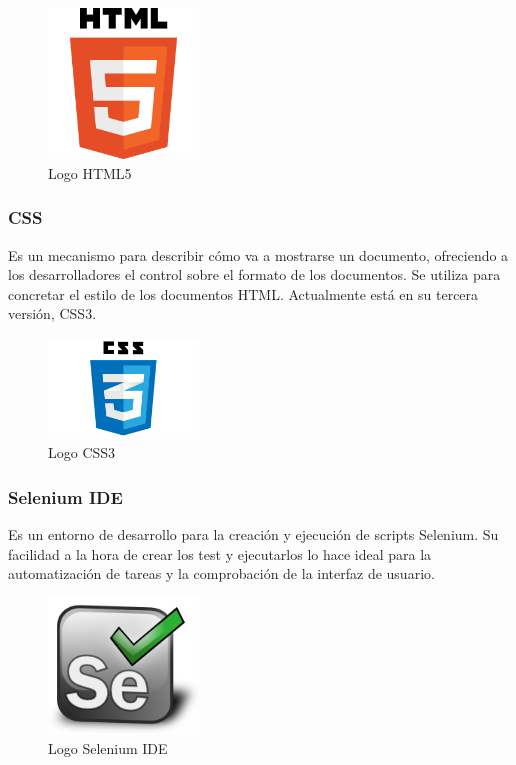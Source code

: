 		\begin{figure}[H]
		\centering
		\includegraphics[width=40mm, fbox={\fboxrule} 4mm]{images/04-metodo/26-html_logo.png}
		\caption{Logo HTML5}
		\label{fig:html5-logo}
		\end{figure}
		
		\subsubsection{\ac{CSS}}
		Es un mecanismo para describir cómo va a mostrarse un documento, ofreciendo a los desarrolladores el control sobre el formato de los documentos. Se utiliza para concretar el estilo de los documentos \ac{HTML}. Actualmente está en su tercera versión, \ac{CSS}3.

		\begin{figure}[H]
		\centering
		\includegraphics[width=40mm, fbox={\fboxrule} 4mm]{images/04-metodo/27-css3_logo.png}
		\caption{Logo CSS3}
		\label{fig:css3-logo}
		\end{figure}	

		\subsubsection{Selenium IDE}
		Es un entorno de desarrollo para la creación y ejecución de scripts Selenium. Su facilidad a la hora de crear los test y ejecutarlos lo hace ideal para la automatización de tareas y la comprobación de la interfaz de usuario.
		
		\begin{figure}[H]
		\centering
		\includegraphics[width=40mm, fbox={\fboxrule} 4mm]{images/04-metodo/40-selenium_logo.png}
		\caption{Logo Selenium IDE}
		\label{fig:selenium-logo}
		\end{figure}
				
